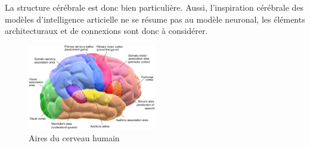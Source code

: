 La structure cérébrale est donc bien particulière. Aussi, l'inspiration cérébrale des modèles d'intelligence articielle ne se résume pas au modèle neuronal, les éléments architecturaux et de connexions sont donc à considérer. 
\begin{figure}[t]
\centering
\includegraphics[width=0.5\textwidth]{Blausen_0102.png}
\caption{Aires du cerveau humain}
\end{figure}

